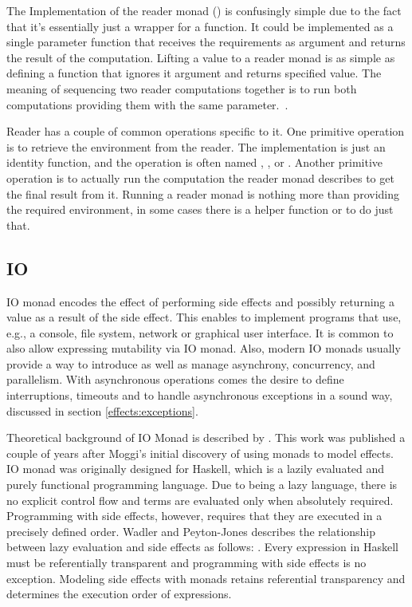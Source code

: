 

The Implementation of the reader monad () is confusingly simple due to the fact that it's essentially just a wrapper for a function. It could be implemented as a single parameter function that receives the requirements as argument and returns the result of the computation. Lifting a value to a reader monad is as simple as defining a function that ignores it argument and returns specified value. The meaning of sequencing two reader computations together is to run both computations providing them with the same parameter.~\cite{fp-overloading-ho-polymorphism}.

Reader has a couple of common operations specific to it. One primitive operation is to retrieve the environment from the reader. The implementation is just an identity function, and the operation is often named , , or . Another primitive operation is to actually run the computation the reader monad describes to get the final result from it. Running a reader monad is nothing more than providing the required environment, in some cases there is a helper function  or  to do just that.


\subsection{IO}
IO monad encodes the effect of performing side effects and possibly returning a value as a result of the side effect. This enables to implement programs that use, e.g., a console, file system, network or graphical user interface. It is common to also allow expressing mutability via IO monad. Also, modern IO monads usually provide a way to introduce as well as manage asynchrony, concurrency, and parallelism. With asynchronous operations comes the desire to define interruptions, timeouts and to handle asynchronous exceptions in a sound way, discussed in section \ref{effects:exceptions}.

Theoretical background of IO Monad is described by \textcite{imperative-fp}. This work was published a couple of years after Moggi's initial discovery of using monads to model effects. IO monad was originally designed for Haskell, which is a lazily evaluated and purely functional programming language. Due to being a lazy language, there is no explicit control flow and terms are evaluated only when absolutely required. Programming with side effects, however, requires that they are executed in a precisely defined order. Wadler and Peyton-Jones describes the relationship between lazy evaluation and side effects as follows: . Every expression in Haskell must be referentially transparent and programming with side effects is no exception. Modeling side effects with monads retains referential transparency and determines the execution order of expressions.

